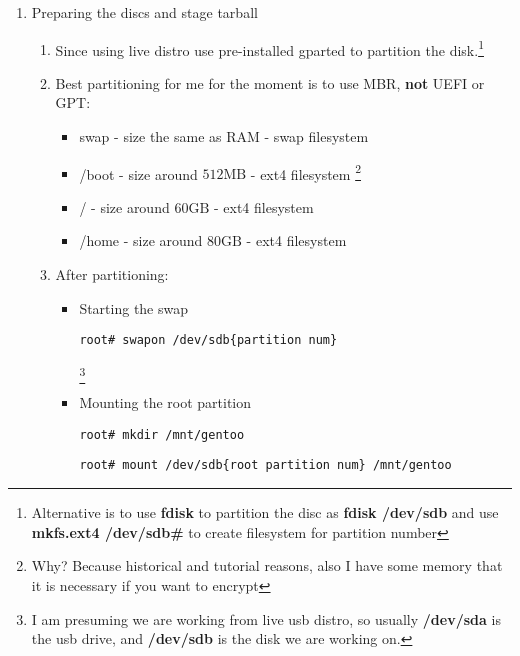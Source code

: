 \documentclass[10pt,a4paper]{article}
\begin{document}
	\begin{enumerate}
		
		\newpage
		
		\item Preparing the discs and stage tarball \begin{enumerate}[label*=\arabic*.]
			
			\item Since using live distro use pre-installed gparted to partition the disk.\footnote{ Alternative is to use \textbf{fdisk} to partition the disc as \textbf{fdisk /dev/sdb} and use \textbf{mkfs.ext4 /dev/sdb\#} to create filesystem for partition number }
			
			\item Best partitioning for me for the moment is to use MBR, \textbf{not} UEFI or GPT:\begin{itemize}
				\item swap - size the same as RAM - swap filesystem 
				\item /boot - size around $ 512\mbox{MB} $  - ext4 filesystem \footnote{Why? Because historical and tutorial reasons, also I have some memory that it is necessary if you want to encrypt }
				\item / - size around $ 60\mbox{GB} $ - ext4 filesystem
				\item /home - size around $ 80\mbox{GB} $ - ext4 filesystem
			\end{itemize}
			
			\item After partitioning:\begin{itemize}

				\item Starting the swap 
\begin{lstlisting}[style=BashInputRoot]
root# swapon /dev/sdb{partition num}
\end{lstlisting}\footnote{ I am presuming we are working from live usb distro, so usually \textbf{/dev/sda} is the usb drive, and \textbf{/dev/sdb} is the disk we are working on.}
				
				\item Mounting the root partition 
\begin{lstlisting}[style=BashInputRoot]
root# mkdir /mnt/gentoo
\end{lstlisting}
\begin{lstlisting}[style=BashInputRoot]
root# mount /dev/sdb{root partition num} /mnt/gentoo
\end{lstlisting}


\end{itemize}
\end{enumerate}
\end{enumerate}
\end{document}
